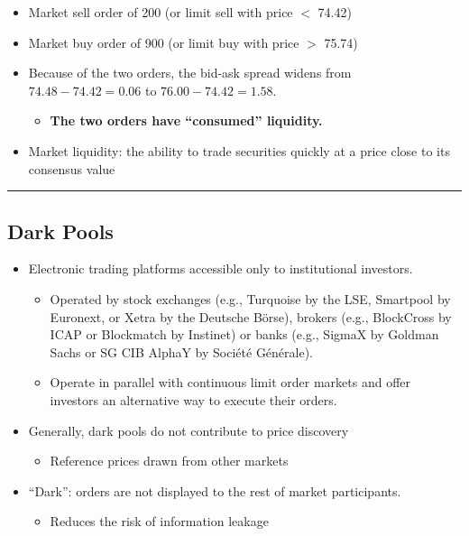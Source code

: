 \documentclass[
  letterpaper,
  DIV=11,
  numbers=noendperiod]{scrartcl}
\providecommand{\tightlist}{%
  \setlength{\itemsep}{0pt}\setlength{\parskip}{0pt}}\usepackage{longtable,booktabs,array}
\begin{document}
\begin{itemize}
\tightlist
\item
  Market sell order of 200 (or limit sell with price \(<\) 74.42)
\item
  Market buy order of 900 (or limit buy with price \(>\) 75.74)
\item
  Because of the two orders, the bid-ask spread widens from
  \(74.48 - 74.42 = 0.06\) to \(76.00 - 74.42 = 1.58\).

  \begin{itemize}
  \tightlist
  \item
    \textbf{The two orders have ``consumed'' liquidity.}
  \end{itemize}
\item
  Market liquidity: the ability to trade securities quickly at a price
  close to its consensus value
\end{itemize}

\begin{center}\rule{0.5\linewidth}{0.5pt}\end{center}

\subsection{Dark Pools}\label{dark-pools}

\begin{itemize}
\item
  Electronic trading platforms accessible only to institutional
  investors.

  \begin{itemize}
  \tightlist
  \item
    Operated by stock exchanges (e.g., Turquoise by the LSE, Smartpool
    by Euronext, or Xetra by the Deutsche Börse), brokers (e.g.,
    BlockCross by ICAP or Blockmatch by Instinet) or banks (e.g., SigmaX
    by Goldman Sachs or SG CIB AlphaY by Société Générale).
  \item
    Operate in parallel with continuous limit order markets and offer
    investors an alternative way to execute their orders.
  \end{itemize}
\item
  Generally, dark pools do not contribute to price discovery

  \begin{itemize}
  \tightlist
  \item
    Reference prices drawn from other markets
  \end{itemize}
\item
  ``Dark'': orders are not displayed to the rest of market participants.

  \begin{itemize}
  \tightlist
  \item
    Reduces the risk of information leakage
  \end{itemize}
\end{itemize}
\end{document}
